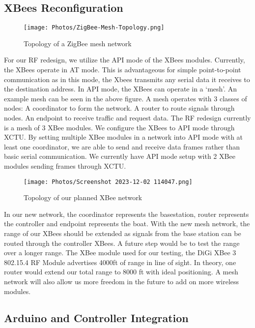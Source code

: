 \documentclass{article}
\begin{document}
\subsection{XBees Reconfiguration}
\begin{figure}[htp]
    \centering
    \texttt{[image: Photos/ZigBee-Mesh-Topology.png]}
    \caption{Topology of a ZigBee mesh network}
    \label{fig:Photos/ZigBee-Mesh-Topology.png}
\end{figure}

For our RF redesign, we utilize the API mode of the XBees modules. Currently, the XBees operate in AT mode. This is advantageous for simple point-to-point communication as in this mode, the Xbees transmits any serial data it receives to the destination address. In API mode, the XBees can operate in a ‘mesh’. An example mesh can be seen in the above figure. A mesh operates with 3 classes of nodes: A coordinator to form the network. A router to route signals through nodes. An endpoint to receive traffic and request data. The RF redesign currently is a mesh of 3 XBee modules. We configure the XBees to API mode through XCTU. By setting multiple XBee modules in a network into API mode with at least one coordinator, we are able to send and receive data frames rather than basic serial communication. We currently have API mode setup with 2 XBee modules sending frames through XCTU.
\begin{figure}[htp]
    \centering
    \texttt{[image: Photos/Screenshot 2023-12-02 114047.png]}
    \caption{Topology of our planned XBee network}
    \label{Photos/fig:Screenshot 2023-12-02 114047.png}
\end{figure}


\noindent In our new network, the coordinator represents the basestation, router represents the controller and endpoint represents the boat. With the new mesh network, the range of our XBees should be extended as signals from the base station can be routed through the controller XBees. A future step would be to test the range over a longer range. The XBee module used for our testing, the DiGi XBee 3 802.15.4 RF Module advertises 4000ft of range in line of sight. In theory, one router would extend our total range to 8000 ft with ideal positioning. A mesh network will also allow us more freedom in the future to add on more wireless modules.

\subsection{Arduino and Controller Integration}
\end{document}
